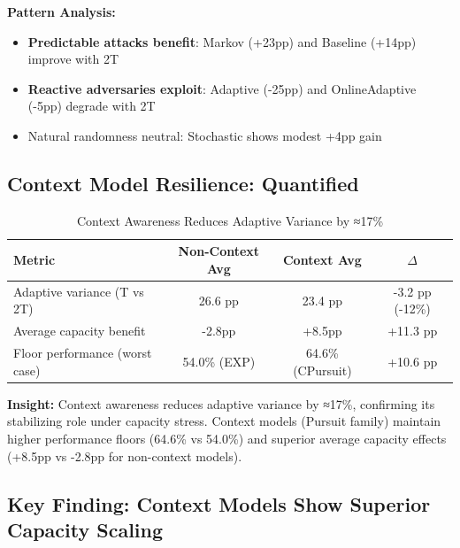 \documentclass[11pt,a4paper]{article}
\newcommand{\critical}[1]{\textcolor{criticalcolor}{\textbf{#1}}}
\newcommand{\success}[1]{\textcolor{successcolor}{\textbf{#1}}}
\begin{document}
\vspace{-0.2cm}

\textbf{Pattern Analysis:}
\begin{itemize}
\vspace{-0.2cm}
\item \success{Predictable attacks benefit}: Markov (+23pp) and Baseline (+14pp) improve with 2T
\vspace{-0.2cm}
\item \critical{Reactive adversaries exploit}: Adaptive (-25pp) and OnlineAdaptive (-5pp) degrade with 2T
\vspace{-0.2cm}
\item Natural randomness neutral: Stochastic shows modest +4pp gain
\end{itemize}

\subsection{Context Model Resilience: Quantified}

\vspace{-0.4cm}

\begin{table}[h]
\scriptsize
\centering
\begin{tabular}{lccc}
\toprule
\textbf{Metric} & \textbf{Non-Context Avg} & \textbf{Context Avg} & \textbf{$\Delta$} \\
\midrule
Adaptive variance (T vs 2T) & 26.6 pp & 23.4 pp & -3.2 pp (-12\%) \\
Average capacity benefit & -2.8pp & +8.5pp & +11.3 pp \\
Floor performance (worst case) & 54.0\% (EXP) & 64.6\% (CPursuit) & +10.6 pp \\
\bottomrule
\end{tabular}
\vspace{-0.2cm}
\caption{Context Awareness Reduces Adaptive Variance by ≈17\%}
\end{table}

\vspace{-0.2cm}

\textbf{Insight:} Context awareness reduces adaptive variance by ≈17\%, confirming its stabilizing role under capacity stress. Context models (Pursuit family) maintain higher performance floors (64.6\% vs 54.0\%) and superior average capacity effects (+8.5pp vs -2.8pp for non-context models).

\subsection{Key Finding: Context Models Show Superior Capacity Scaling}
\end{document}
